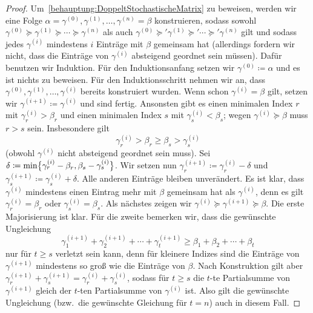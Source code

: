 \begin{proof}
	Um~\ref{behauptung:DoppeltStochastischeMatrix} zu beweisen, werden wir eine Folge $\alpha=\gamma^{(0)},\gamma^{(1)},\dotsc,\gamma^{(n)}=\beta$ konstruieren, sodass sowohl $\gamma^{(0)}\succcurlyeq\gamma^{(1)}\succcurlyeq\dotsb\succcurlyeq\gamma^{(n)}$ als auch $\gamma^{(0)}\succcurlyeq'\gamma^{(1)}\succcurlyeq'\dotsb\succcurlyeq'\gamma^{(n)}$ gilt und sodass jedes $\gamma^{(i)}$ mindestens $i$ Einträge mit $\beta$ gemeinsam hat (allerdings fordern wir nicht, dass die Einträge von $\gamma^{(i)}$ absteigend geordnet sein müssen). Dafür benutzen wir Induktion. Für den Induktionsanfang setzen wir $\gamma^{(0)}\coloneqq \alpha$ und es ist nichts zu beweisen. Für den Induktionsschritt nehmen wir an, dass $\gamma^{(0)},\gamma^{(1)},\dotsc,\gamma^{(i)}$ bereits konstruiert wurden. Wenn schon $\gamma^{(i)}=\beta$ gilt, setzen wir $\gamma^{(i+1)}\coloneqq \gamma^{(i)}$ und sind fertig. Ansonsten gibt es einen minimalen Index $r$ mit $\gamma_r^{(i)}>\beta_r$ und einen minimalen Index $s$ mit $\gamma_s^{(i)}<\beta_s$; wegen $\gamma^{(i)}\succcurlyeq \beta$ muss $r>s$ sein. Insbesondere gilt
	\begin{equation*}
		\gamma_r^{(i)}>\beta_r\geqslant \beta_s>\gamma_s^{(i)}
	\end{equation*}
	(obwohl $\gamma^{(i)}$ nicht absteigend geordnet sein muss). Sei $\delta\coloneqq \min\braces[\big]{\gamma_r^{(i)}-\beta_r,\beta_s-\gamma_s^{(i)}}$. Wir setzen nun $\gamma_r^{(i+1)}\coloneqq \gamma_r^{(i)}-\delta$ und $\gamma_s^{(i+1)}\coloneqq \gamma_s^{(i)}+\delta$. Alle anderen Einträge bleiben unverändert. Es ist klar, dass $\gamma^{(i)}$ mindestens einen Eintrag mehr mit $\beta$ gemeinsam hat als $\gamma^{(i)}$, denn es gilt $\gamma_r^{(i)}=\beta_r$ oder $\gamma_s^{(i)}=\beta_s$. Als nächstes zeigen wir $\gamma^{(i)}\succcurlyeq \gamma^{(i+1)}\succcurlyeq \beta$. Die erste Majorisierung ist klar. Für die zweite bemerken wir, dass die gewünschte Ungleichung
	\begin{equation*}
			\gamma_1^{(i+1)}+\gamma_2^{(i+1)}+\dotsb+\gamma_t^{(i+1)}\geqslant \beta_1+\beta_2+\dotsb+\beta_t
	\end{equation*}
	nur für $t\geqslant s$ verletzt sein kann, denn für kleinere Indizes sind die Einträge von $\gamma^{(i+1)}$ mindestens so groß wie die Einträge von $\beta$. Nach Konstruktion gilt aber $\gamma_r^{(i+1)}+\gamma_s^{(i+1)}=\gamma_r^{(i)}+\gamma_s^{(i)}$, sodass für $t\geqslant s$ die $t$-te Partialsumme von $\gamma^{(i+1)}$ gleich der $t$-ten Partialsumme von $\gamma^{(i)}$ ist. Also gilt die gewünschte Ungleichung (bzw.\ die gewünschte Gleichung für $t=n$) auch in diesem Fall.
	

\end{proof}
